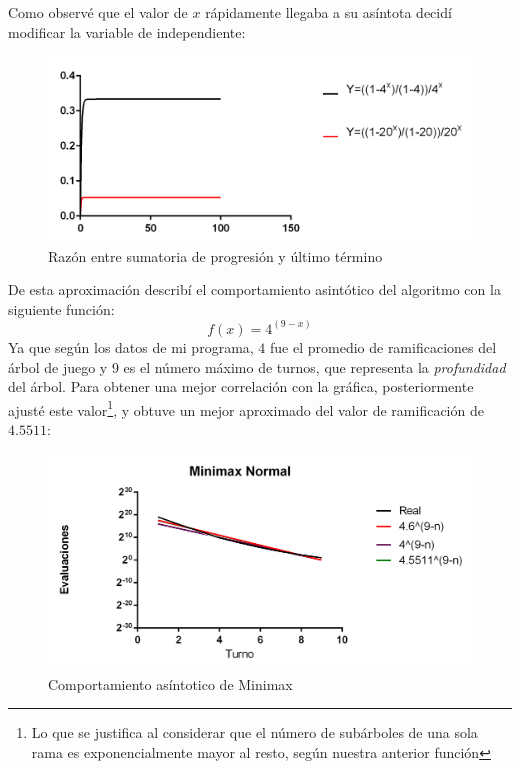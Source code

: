 Como observé que el valor de $x$ rápidamente llegaba a su asíntota decidí modificar la variable de independiente: 
\begin{figure}[H]
\centering
\includegraphics{Graphs/Funciones1.png}
\caption{Razón entre sumatoria de progresión y último término}\label{graf1}
\end{figure}

De esta aproximación describí el comportamiento asintótico del algoritmo con la siguiente función:
\begin{equation}
f(x) = 4^(9-x)
\end{equation}
Ya que según los datos de mi programa, $4$ fue el promedio de ramificaciones del árbol de juego y 9 es el número máximo de turnos, que representa la \emph{profundidad} del árbol. Para obtener una mejor correlación con la gráfica, posteriormente ajusté este valor\footnote{Lo que se justifica al considerar que el número de subárboles de una sola rama es exponencialmente mayor al resto, según nuestra anterior función}, y obtuve un mejor aproximado del valor de ramificación de $4.5511$: 
\begin{figure}[H]
\centering
\includegraphics{Graphs/Minis_ Exposimples.png}
\caption{Comportamiento asíntotico de Minimax}\label{graf2}
\end{figure}

